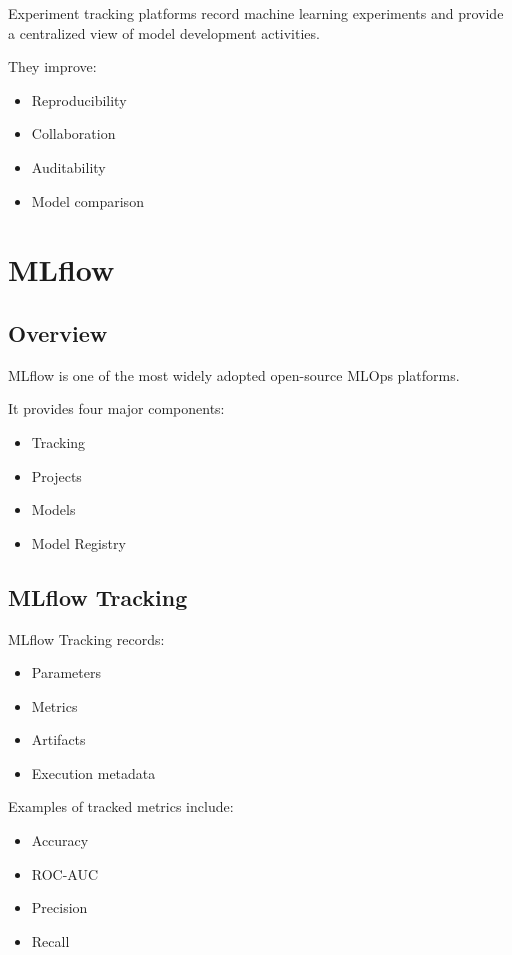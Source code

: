 Experiment tracking platforms record machine learning experiments and provide a centralized view of model development activities.

They improve:

\begin{itemize}
    \item Reproducibility
    \item Collaboration
    \item Auditability
    \item Model comparison
\end{itemize}

\section{MLflow}

\subsection{Overview}

MLflow is one of the most widely adopted open-source MLOps platforms.

It provides four major components:

\begin{itemize}
    \item Tracking
    \item Projects
    \item Models
    \item Model Registry
\end{itemize}

\subsection{MLflow Tracking}

MLflow Tracking records:

\begin{itemize}
    \item Parameters
    \item Metrics
    \item Artifacts
    \item Execution metadata
\end{itemize}

Examples of tracked metrics include:

\begin{itemize}
    \item Accuracy
    \item ROC-AUC
    \item Precision
    \item Recall
\end{itemize}

